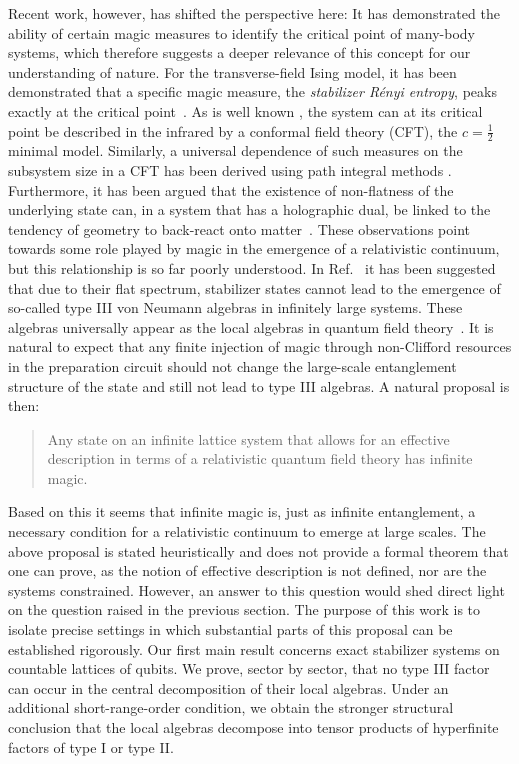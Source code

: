 \documentclass[aps,pra,reprint,superscriptaddress]{revtex4-2}
\theoremstyle{definition}
\theoremstyle{remark}
\begin{document}
Recent work, however, has shifted the perspective here: It has demonstrated the ability of certain magic measures to identify the critical point of many-body systems, which therefore suggests a deeper relevance of this concept for our understanding of nature. For the transverse-field Ising model, it has been
demonstrated that a specific magic measure, the \emph{stabilizer R\'enyi entropy},
peaks exactly at the critical
point~\cite{oliviero2022magicstateresourcetheory}. As is well known \cite{Pfeuty:1970qrn,LiebSchultzMattis1961,BloteCardyNightingale1986,Affleck1986}, the system can at its critical point be described in the infrared by a conformal
field theory (CFT), the $c = \frac{1}{2}$ minimal model. Similarly, a universal dependence of such measures on the subsystem size in a CFT has been derived using path integral methods \cite{Hoshino:2025jko}.
Furthermore, it has been argued that the existence of non-flatness of the
underlying state can, in a system that has a holographic dual, be linked to the
tendency of geometry to back-react onto matter~\cite{cao2024gravitationalbackreactionmagical}.
These observations point towards some role played by magic in the emergence of
a relativistic continuum, but this relationship is so far poorly
understood.
In Ref.~\cite{Chemissany:2025vye} it has been suggested 
that due to their flat spectrum, stabilizer states cannot lead to the emergence of so-called type III von Neumann algebras in infinitely large systems. These algebras universally appear as the local algebras in quantum field theory~\cite{Fredenhagen1985}. It is natural to expect that any finite injection of magic through non-Clifford resources in the preparation circuit should not change the large-scale entanglement structure of the state and still not lead to type III algebras. A natural proposal is then:
\begin{quote}
    Any state on an infinite lattice system that allows for an effective description in terms of a relativistic quantum field theory has infinite magic.
\end{quote}
Based on this it seems that infinite magic is, just as infinite entanglement, a necessary condition for a relativistic
continuum to emerge at large scales. The above proposal is stated heuristically and does not provide a formal theorem that one can prove, as the notion of effective description is not defined, nor are the systems constrained. However, an answer to this question would shed direct light on the question raised in the previous section. The purpose of this work is to isolate precise settings in which substantial parts of this proposal can be established rigorously. Our first main result concerns exact stabilizer systems on countable lattices of qubits. We prove, sector by sector, that no type III factor can occur in the central decomposition of their local algebras. Under an additional short-range-order condition, we obtain the stronger structural conclusion that the local algebras decompose into tensor products of hyperfinite factors of type I or type II.
\end{document}
